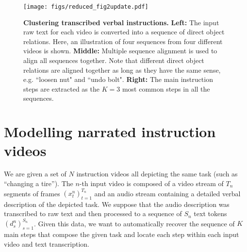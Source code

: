\documentclass[10pt,twocolumn,letterpaper]{article}
\begin{document}
%
%
%

%
%
%
%
%
%
%
%
%
%
%
%
%

\begin{figure*}[t]
\texttt{[image: figs/reduced\_fig2update.pdf]}
   \caption{\small {\bf Clustering transcribed verbal instructions.} {\bf Left:} The input raw text for each video is converted into a sequence of direct object relations. Here, an illustration of four sequences from four different videos is shown.  {\bf Middle:} Multiple sequence alignment is used to align all sequences together. Note that different direct object relations are aligned together as long as they have the same sense, e.g. ``loosen nut" and ``undo bolt".  {\bf Right:} The main instruction steps are extracted as the $K=3$ most common steps in all the sequences. \vspace{-.3cm}
   }
   \label{tab:MSAillustration}
   \vspace*{-0.1cm}
\end{figure*}

%
%
%
%
%
%
%
%
%
%
%
%
%
%
%
%
%
%

\section{Modelling narrated instruction videos}
\label{subsec:model_var}

We are given a set of $N$ instruction videos all depicting the same task (such as ``changing a tire'').
The $n$-th input video is composed of a video stream of $T_n$ segments of frames $(x^n_t)_{t=1}^{T_n}$ and an audio stream containing a detailed verbal description of the depicted task. 
We suppose that the audio description was transcribed to raw text and then processed to a sequence of $S_n$ text tokens $(d^n_s)_{s=1}^{S_n}$. 
Given this data, we want to automatically recover the sequence of $K$ main steps that compose the given task and locate each step within each input video and text transcription. 
\end{document}
